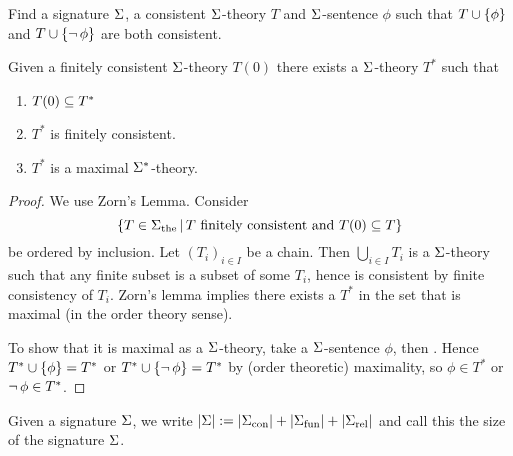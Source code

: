 \begin{ex}
    Find a signature $\Sigma$, a consistent $\Sigma$-theory $T$
    and $\Sigma$-sentence $\phi$ such that  
    $T \cup \left\{\phi\right\}$ and 
    $T \cup \left\{\neg\, \phi\right\}$ are both consistent.
\end{ex}
    
\begin{prop}
    Given a finitely consistent $\Sigma$-theory $T(0)$
    there exists a $\Sigma$-theory $T^*$ such that 
    \begin{enumerate}
        \item $T(0) \subseteq T^*$
        \item $T^*$ is finitely consistent.
        \item $T^*$ is a maximal $\Sigma^*$-theory.
    \end{enumerate}
\end{prop}
\begin{proof}
    We use Zorn's Lemma.
    Consider
    \[\left\{T \in {\Sigma}_\mathrm{the} \,|\, T 
    \text{ finitely consistent and } T(0) \subseteq T\right\}\]
    be ordered by inclusion.
    Let $(T_i)_{i \in I}$ be a chain.
    Then $\bigcup_{i \in I} T_i$ is a $\Sigma$-theory
    such that any finite subset is a subset of some $T_i$,
    hence is consistent by finite consistency of $T_i$.
    Zorn's lemma implies there exists a $T^*$ in the set
    that is maximal (in the order theory sense).
    
    To show that it is maximal as a $\Sigma$-theory, 
    take a $\Sigma$-sentence $\phi$, then
    .
    Hence $T^* \cup \left\{\phi\right\} = T^*$ or 
    $T^* \cup \left\{\neg\, \phi\right\} = T^*$ by (order theoretic) maximality,
    so $\phi \in T^*$ or $\neg\, \phi \in T^*$.
\end{proof}

\begin{nttn}
    Given a signature $\Sigma$, 
    we write
    $|\Sigma| := |{\Sigma}_\mathrm{con}| + |{\Sigma}_\mathrm{fun}| + |{\Sigma}_\mathrm{rel}|$
    and call this the size of the signature $\Sigma$.
\end{nttn}

